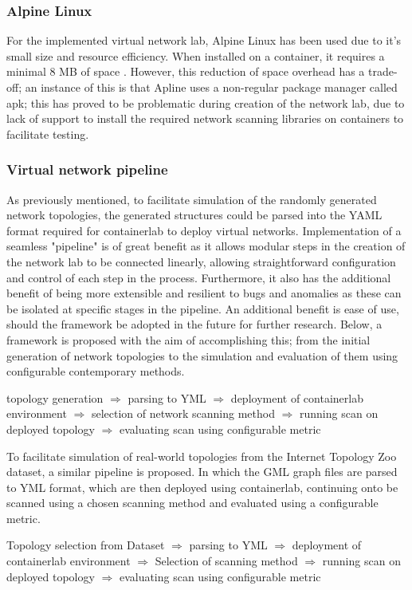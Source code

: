 \subsubsection{Alpine Linux}
For the implemented virtual network lab, Alpine Linux has been used due to it's small size and resource efficiency. When installed on a container, it  requires a minimal 8 MB of space \cite{alpine}. However, this reduction of space overhead has a trade-off; an instance of this is that Apline uses a non-regular package manager called apk; this has proved to be problematic during creation of the network lab, due to lack of support to install the required network scanning libraries on containers to facilitate testing. 

\subsubsection{Virtual network pipeline}
As previously mentioned, to facilitate simulation of the randomly generated network topologies, the generated structures could be parsed into the YAML format required for containerlab to deploy virtual networks. Implementation of a seamless "pipeline" is of great benefit as it allows modular steps in the creation of the network lab to be connected linearly, allowing straightforward configuration and control of each step in the process. Furthermore, it also has the additional benefit of being more extensible and resilient to bugs and anomalies as these can be isolated at specific stages in the pipeline. An additional benefit is ease of use, should the framework be adopted in the future for further research. Below, a framework is proposed with the aim of accomplishing this; from the initial generation of network topologies to the simulation and evaluation of them using configurable contemporary methods. 

topology generation $\Rightarrow$ parsing to YML $\Rightarrow$ deployment of containerlab environment $\Rightarrow$ selection of network scanning method $\Rightarrow$ running scan on deployed topology $\Rightarrow$ evaluating scan using configurable metric 

To facilitate simulation of real-world topologies from the Internet Topology Zoo dataset, a similar pipeline is proposed. In which the GML graph files are parsed to YML format, which are then deployed using containerlab, continuing onto be scanned using a chosen scanning method and evaluated using a configurable metric.  

Topology selection from Dataset $\Rightarrow$ parsing to YML $\Rightarrow$ deployment of containerlab environment $\Rightarrow$ Selection of scanning method $\Rightarrow$ running scan on deployed topology $\Rightarrow$ evaluating scan using configurable metric 

